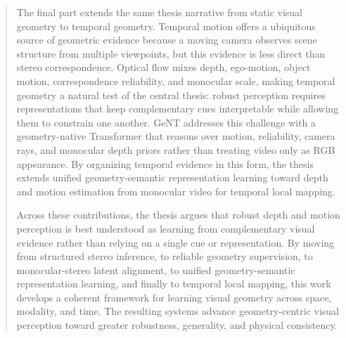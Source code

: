 \documentclass[11pt]{gsasthesis} %
\begin{document}
\begin{abstract}
The final part extends the same thesis narrative from static visual geometry to temporal geometry.
Temporal motion offers a ubiquitous source of geometric evidence because a moving camera observes scene structure from multiple viewpoints, but this evidence is less direct than stereo correspondence.
Optical flow mixes depth, ego-motion, object motion, correspondence reliability, and monocular scale, making temporal geometry a natural test of the central thesis: robust perception requires representations that keep complementary cues interpretable while allowing them to constrain one another.
GeNT addresses this challenge with a geometry-native Transformer that reasons over motion, reliability, camera rays, and monocular depth priors rather than treating video only as RGB appearance.
By organizing temporal evidence in this form, the thesis extends unified geometry-semantic representation learning toward depth and motion estimation from monocular video for temporal local mapping.

Across these contributions, the thesis argues that robust depth and motion perception is best understood as learning from complementary visual evidence rather than relying on a single cue or representation.
By moving from structured stereo inference, to reliable geometry supervision, to monocular-stereo latent alignment, to unified geometry-semantic representation learning, and finally to temporal local mapping, this work develops a coherent framework for learning visual geometry across space, modality, and time.
The resulting systems advance geometry-centric visual perception toward greater robustness, generality, and physical consistency.
\end{abstract}
\end{document}

